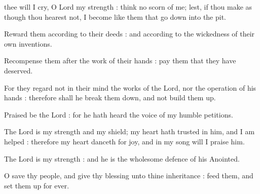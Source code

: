 
 thee will I cry, O Lord my strength : think no scorn of me; lest, if thou make as though thou hearest not, I become like them that go down into the pit.\par
{}
Reward them according to their deeds : and according to the wickedness of their own inventions.\par
{}Recompense them after the work of their hands : pay them that they have deserved.\par
{}For they regard not in their mind the works of the Lord, nor the operation of his hands : therefore shall he break them down, and not build them up.\par
{}Praised be the Lord : for he hath heard the voice of my humble petitions.\par
{}The Lord is my strength and my shield; my heart hath trusted in him, and I am helped : therefore my heart danceth for joy, and in my song will I praise him.\par
{}The Lord is my strength : and he is the wholesome defence of his Anointed.\par
{}O save thy people, and give thy blessing unto thine inheritance : feed them, and set them up for ever.\par


